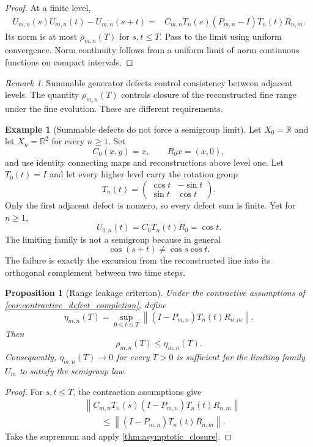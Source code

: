 \documentclass{aomart}
\newtheorem{proposition}[proposition]{Proposition}
\theoremstyle{definition}
\newtheorem{example}[example]{Example}
\theoremstyle{remark}
\newtheorem{remark}[remark]{Remark}
\newcommand{\RR}{\mathbb R}
\newcommand{\norm}[1]{\left\lVert#1\right\rVert}
\begin{document}
\begin{proof}
At a finite level,
\[
\begin{aligned}
U_{m,n}(s)U_{m,n}(t)-U_{m,n}(s+t)
={}&
C_{m,n}T_n(s)
(P_{m,n}-I)
T_n(t)R_{n,m}.
\end{aligned}
\]
Its norm is at most \(\rho_{m,n}(T)\) for \(s,t\leq T\). Pass to the limit using uniform convergence. Norm continuity follows from a uniform limit of norm continuous functions on compact intervals.
\end{proof}

\begin{remark}
Summable generator defects control consistency between adjacent levels. The quantity \(\rho_{m,n}(T)\) controls closure of the reconstructed fine range under the fine evolution. These are different requirements.
\end{remark}

\begin{example}[Summable defects do not force a semigroup limit]\label{ex:summable_not_semigroup}
Let \(X_0=\RR\) and let \(X_n=\RR^2\) for every \(n\geq1\). Set
\[
C_0(x,y)=x,
\qquad
R_0x=(x,0),
\]
and use identity connecting maps and reconstructions above level one. Let \(T_0(t)=I\) and let every higher level carry the rotation group
\[
T_n(t)
=
\begin{pmatrix}
\cos t&-\sin t\\
\sin t&\cos t
\end{pmatrix}.
\]
Only the first adjacent defect is nonzero, so every defect sum is finite. Yet for \(n\geq1\),
\[
U_{0,n}(t)=C_0T_n(t)R_0=\cos t.
\]
The limiting family is not a semigroup because in general
\[
\cos(s+t)\neq\cos s\cos t.
\]
The failure is exactly the excursion from the reconstructed line into its orthogonal complement between two time steps.
\end{example}

\begin{proposition}[Range leakage criterion]\label{prop:range_leakage}
Under the contractive assumptions of \cref{cor:contractive_defect_completion}, define
\[
\eta_{m,n}(T)
=
\sup_{0\leq t\leq T}
\norm{(I-P_{m,n})T_n(t)R_{n,m}}.
\]
Then
\[
\rho_{m,n}(T)\leq\eta_{m,n}(T).
\]
Consequently, \(\eta_{m,n}(T)\to0\) for every \(T>0\) is sufficient for the limiting family \(U_m\) to satisfy the semigroup law.
\end{proposition}

\begin{proof}
For \(s,t\leq T\), the contraction assumptions give
\[
\begin{aligned}
&\norm{
C_{m,n}T_n(s)(I-P_{m,n})T_n(t)R_{n,m}
}\\
&\qquad\leq
\norm{(I-P_{m,n})T_n(t)R_{n,m}}.
\end{aligned}
\]
Take the supremum and apply \cref{thm:asymptotic_closure}.
\end{proof}
\end{document}
